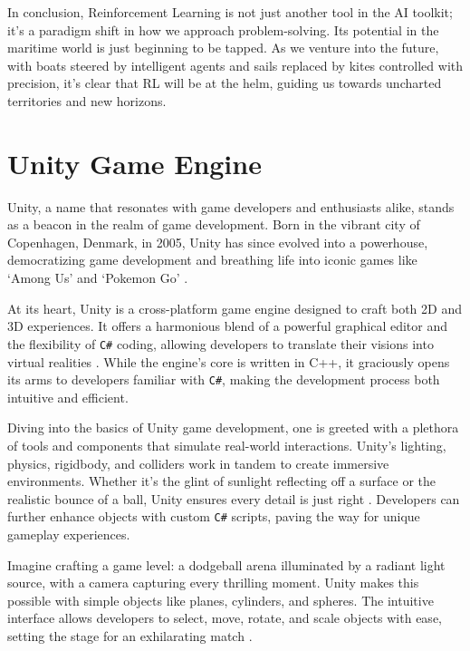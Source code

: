 In conclusion, Reinforcement Learning is not just another tool in the AI toolkit; it's a paradigm shift in how we approach problem-solving. Its potential in the maritime world is just beginning to be tapped. As we venture into the future, with boats steered by intelligent agents and sails replaced by kites controlled with precision, it's clear that RL will be at the helm, guiding us towards uncharted territories and new horizons\cite{mnih2015humanlevel}.

\section{Unity Game Engine}

Unity, a name that resonates with game developers and enthusiasts alike, stands as a beacon in the realm of game development. Born in the vibrant city of Copenhagen, Denmark, in 2005, Unity has since evolved into a powerhouse, democratizing game development and breathing life into iconic games like `Among Us' and `Pokemon Go' \cite{unity100seconds}.

At its heart, Unity is a cross-platform game engine designed to craft both 2D and 3D experiences. It offers a harmonious blend of a powerful graphical editor and the flexibility of \texttt{C\#} coding, allowing developers to translate their visions into virtual realities \cite{unitymanual2021}. While the engine's core is written in C++, it graciously opens its arms to developers familiar with \texttt{C\#}, making the development process both intuitive and efficient.

Diving into the basics of Unity game development, one is greeted with a plethora of tools and components that simulate real-world interactions. Unity's lighting, physics, rigidbody, and colliders work in tandem to create immersive environments. Whether it's the glint of sunlight reflecting off a surface or the realistic bounce of a ball, Unity ensures every detail is just right \cite{goldstone2010}. Developers can further enhance objects with custom \texttt{C\#} scripts, paving the way for unique gameplay experiences.

Imagine crafting a game level: a dodgeball arena illuminated by a radiant light source, with a camera capturing every thrilling moment. Unity makes this possible with simple objects like planes, cylinders, and spheres. The intuitive interface allows developers to select, move, rotate, and scale objects with ease, setting the stage for an exhilarating match \cite{harrison2013}.

